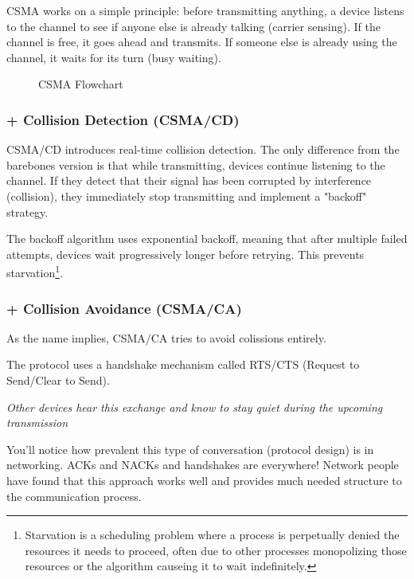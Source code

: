 CSMA works on a simple principle: before transmitting anything, a device listens to the channel to see if anyone else is already talking (carrier sensing). If the channel is free, it goes ahead and transmits. If someone else is already using the channel, it waits for its turn (busy waiting).

\begin{figure}[h]
    \centering
    \scalebox{0.7}{}
    \caption{CSMA Flowchart}
    \label{fig:csma-normal}
\end{figure}

\subsubsection{+ Collision Detection (CSMA/CD)}
CSMA/CD introduces real-time collision detection. The only difference from the barebones version is that while transmitting, devices continue listening to the channel. If they detect that their signal has been corrupted by interference (collision), they immediately stop transmitting and implement a "backoff" strategy.

The backoff algorithm uses exponential backoff, meaning that after multiple failed attempts, devices wait progressively longer before retrying. This prevents starvation\footnote{
    Starvation is a scheduling problem where a process is perpetually denied the resources it needs to proceed, often due to other processes monopolizing those resources or the algorithm causeing it to wait indefinitely.
}.
\subsubsection{+ Collision Avoidance (CSMA/CA)}
As the name implies, CSMA/CA tries to avoid colissions entirely.

The protocol uses a handshake mechanism called RTS/CTS (Request to Send/Clear to Send).

\begin{tcolorbox}[colback=gray!10, colframe=gray!50, arc=3mm, left=2mm, right=2mm, boxrule=1pt, before skip=5mm, after skip=5mm]
    \textit{Other devices hear this exchange and know to stay quiet during the upcoming transmission}
\end{tcolorbox}

You'll notice how prevalent this type of conversation (protocol design) is in networking. ACKs and NACKs and handshakes are everywhere! Network people have found that this approach works well and provides much needed structure to the communication process.

